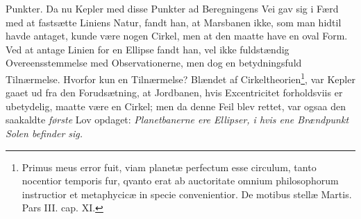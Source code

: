 \documentclass[12pt,a4paper]{book}
\begin{document}
Punkter.
Da nu Kepler med disse Punkter ad Beregningens Vei gav sig i Færd med at
fastsætte Liniens Natur, fandt han, at Marsbanen ikke, som man hidtil
havde antaget, kunde være nogen Cirkel, men at den maatte have en oval
Form. Ved at antage Linien for en Ellipse fandt han, vel ikke
fuldstændig Overeensstemmelse med Observationerne, men dog en
betydningsfuld Tilnærmelse. Hvorfor kun en Tilnærmelse? Blændet af
Cirkeltheorien\footnote{%
Primus meus error fuit, viam planetæ perfectum esse circulum, tanto
nocentior temporis fur, qvanto erat ab auctoritate omnium philosophorum
instructior et metaphycicæ in specie convenientior. De motibus stellæ
Martis. Pars III. cap. XI.}, var Kepler gaaet ud fra den Forudsætning,
at Jordbanen, hvis Excentricitet forholdsviis er ubetydelig, maatte være
en Cirkel; men da denne Feil blev rettet, var ogsaa den saakaldte
\emph{første} Lov opdaget: \emph{Planetbanerne ere Ellipser, i hvis ene
Brændpunkt Solen befinder sig.}
\end{document}
